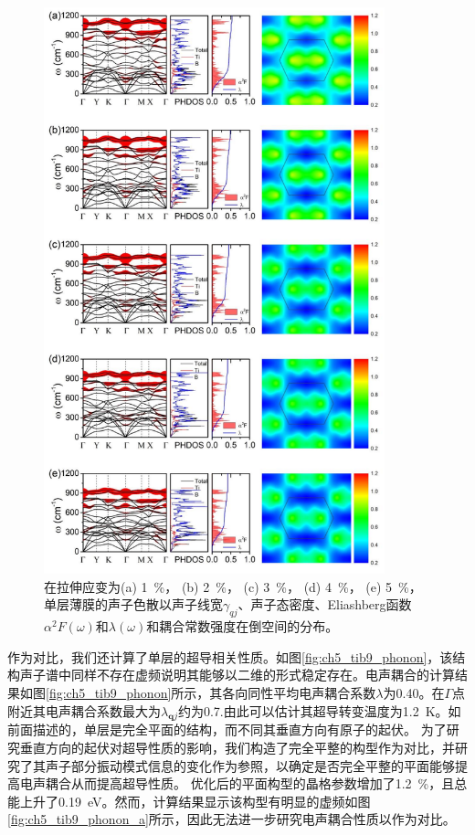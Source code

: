 \begin{figure}
  \includegraphics[width=0.88\textwidth]{figs/ch5_details_strains.png}
  \centering
  \caption{在拉伸应变为(a) \SI{1}{\percent}， (b) \SI{2}{\percent}， (c) \SI{3}{\percent}， (d) \SI{4}{\percent}， (e) \SI{5}{\percent}，单层薄膜的声子色散以声子线宽$\gamma_{qj}$、声子态密度、Eliashberg函数$\alpha^2 F(\omega)$和$\lambda(\omega)$和耦合常数强度在倒空间的分布。}
  \label{fig:ch5_details_strains}
\end{figure}

作为对比，我们还计算了单层的超导相关性质。如图\ref{fig:ch5_tib9_phonon}，该结构声子谱中同样不存在虚频说明其能够以二维的形式稳定存在。电声耦合的计算结果如图\ref{fig:ch5_tib9_phonon}所示，其各向同性平均电声耦合系数$\lambda$为0.40。在$\Gamma$点附近其电声耦合系数最大为$\lambda_{\bm{q}j}$约为0.7.由此可以估计其超导转变温度为\SI{1.2}{\kelvin}。如前面描述的，单层是完全平面的结构，而不同其垂直方向有原子的起伏。
为了研究垂直方向的起伏对超导性质的影响，我们构造了完全平整的构型作为对比，并研究了其声子部分振动模式信息的变化作为参照，以确定是否完全平整的平面能够提高电声耦合从而提高超导性质。
优化后的平面构型的晶格参数增加了\SI{1.2}{\percent}，且总能上升了\SI{0.19}{\eV}。然而，计算结果显示该构型有明显的虚频如图\ref{fig:ch5_tib9_phonon_a}所示，因此无法进一步研究电声耦合性质以作为对比。

